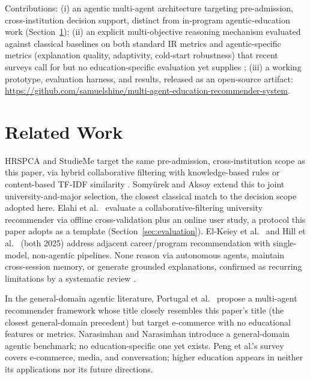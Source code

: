 \documentclass[conference]{IEEEtran}
\begin{document}
Contributions: (i) an agentic multi-agent architecture targeting pre-admission,
cross-institution decision support, distinct from in-program agentic-education work
(Section~\ref{sec:related}); (ii) an explicit multi-objective reasoning mechanism
evaluated against classical baselines on both standard IR metrics and agentic-specific
metrics (explanation quality, adaptivity, cold-start robustness) that recent surveys call
for but no education-specific evaluation yet supplies \cite{llmagentrecsyssurvey}; (iii) a
working prototype, evaluation harness, and results, released as an open-source artifact:
\url{https://github.com/samuelshine/multi-agent-education-recommender-system}.

\section{Related Work}
\label{sec:related}

HRSPCA \cite{hrspca} and StudieMe \cite{studieme} target the same pre-admission,
cross-institution scope as this paper, via hybrid collaborative filtering with
knowledge-based rules \cite{hrspca} or content-based TF-IDF similarity \cite{studieme}.
Somy\"urek and Aksoy \cite{multidmensionalrecsysuni} extend this to joint
university-and-major selection, the closest classical match to the decision scope
adopted here. Elahi et al.\ \cite{universityrecsyselahi} evaluate a collaborative-filtering
university recommender via offline cross-validation plus an online user study, a protocol
this paper adopts as a template (Section~\ref{sec:evaluation}). El-Keiey et al.\
\cite{careerrecfeatureselection} and Hill et al.\ \cite{bertopicprogramrec} (both 2025)
address adjacent career/program recommendation with single-model, non-agentic pipelines.
None reason via autonomous agents, maintain cross-session memory, or generate grounded
explanations, confirmed as recurring limitations by a systematic review
\cite{recommendersyshighered}.

In the general-domain agentic literature, Portugal et al.\
\cite{agenticaiframeworkrecommendersystem} propose a multi-agent recommender framework
whose title closely resembles this paper's title (the closest general-domain
precedent) but target e-commerce with no educational features or metrics. Narasimhan
and Narasimhan \cite{taurecbenchmark} introduce a general-domain agentic benchmark; no
education-specific one yet exists. Peng et al.'s survey \cite{llmagentrecsyssurvey} covers
e-commerce, media, and conversation; higher education appears in neither its
applications nor its future directions.
\end{document}
